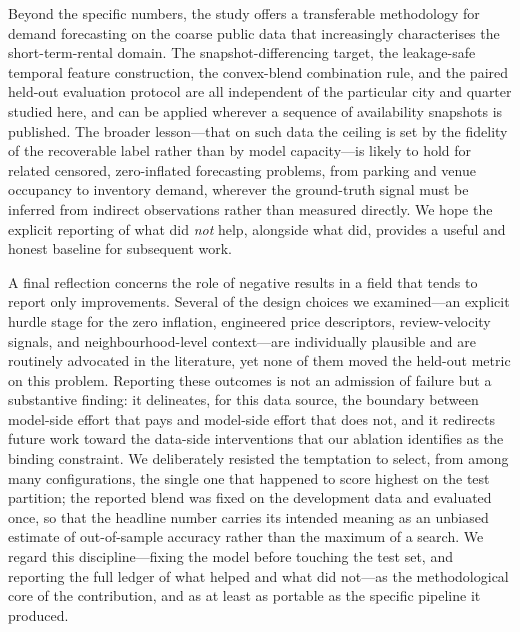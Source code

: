 \documentclass[journal]{IEEEtran}
\begin{document}
Beyond the specific numbers, the study offers a transferable methodology for
demand forecasting on the coarse public data that increasingly characterises the
short-term-rental domain. The snapshot-differencing target, the leakage-safe
temporal feature construction, the convex-blend combination rule, and the paired
held-out evaluation protocol are all independent of the particular city and
quarter studied here, and can be applied wherever a sequence of availability
snapshots is published. The broader lesson---that on such data the ceiling is set
by the fidelity of the recoverable label rather than by model capacity---is likely
to hold for related censored, zero-inflated forecasting problems, from parking and
venue occupancy to inventory demand, wherever the ground-truth signal must be
inferred from indirect observations rather than measured directly. We hope the
explicit reporting of what did \emph{not} help, alongside what did, provides a
useful and honest baseline for subsequent work.

A final reflection concerns the role of negative results in a field that tends to
report only improvements. Several of the design choices we examined---an explicit
hurdle stage for the zero inflation, engineered price descriptors, review-velocity
signals, and neighbourhood-level context---are individually plausible and are
routinely advocated in the literature, yet none of them moved the held-out metric
on this problem. Reporting these outcomes is not an admission of failure but a
substantive finding: it delineates, for this data source, the boundary between
model-side effort that pays and model-side effort that does not, and it redirects
future work toward the data-side interventions that our ablation identifies as the
binding constraint. We deliberately resisted the temptation to select, from among
many configurations, the single one that happened to score highest on the test
partition; the reported blend was fixed on the development data and evaluated once,
so that the headline number carries its intended meaning as an unbiased estimate of
out-of-sample accuracy rather than the maximum of a search. We regard this
discipline---fixing the model before touching the test set, and reporting the full
ledger of what helped and what did not---as the methodological core of the
contribution, and as at least as portable as the specific pipeline it produced.
\end{document}
